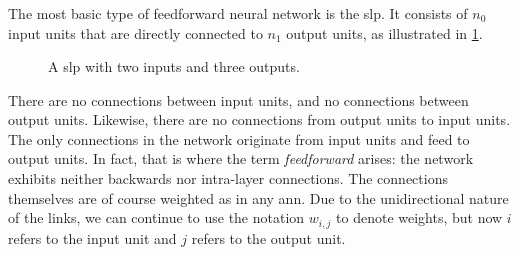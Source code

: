 \documentclass[../main.tex]{subfiles}
\begin{document}
\subsubsection{}
The most basic type of feedforward neural network is the \gls{slp}.
It consists of $n_0$ input units that are directly connected to $n_1$ output units, as illustrated in \cref{fig:slp}.
\begin{figure}
    \centering
    \caption{A \acs{slp} with two inputs and three outputs.}
    \label{fig:slp}
\end{figure}
There are no connections between input units, and no connections between output units.
Likewise, there are no connections from output units to input units. 
The only connections in the network originate from input units and feed to output units. 
In fact, that is where the term \emph{feedforward} arises: the network exhibits neither backwards nor intra-layer connections.
The connections themselves are of course weighted as in any \gls{ann}.
Due to the unidirectional nature of the links, we can continue to use the notation $w_{i,j}$ to denote weights, but now $i$ refers to the input unit and $j$ refers to the output unit.
\end{document}
